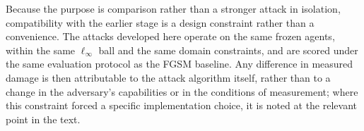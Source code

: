 Because the purpose is comparison rather than a stronger attack in isolation,
compatibility with the earlier stage is a design constraint rather than a
convenience. The attacks developed here operate on the same frozen agents, within
the same $\ell_\infty$ ball and the same domain constraints, and are scored under
the same evaluation protocol as the FGSM baseline. Any difference in measured
damage is then attributable to the attack algorithm itself, rather than to a
change in the adversary's capabilities or in the conditions of measurement; where
this constraint forced a specific implementation choice, it is noted at the
relevant point in the text.
